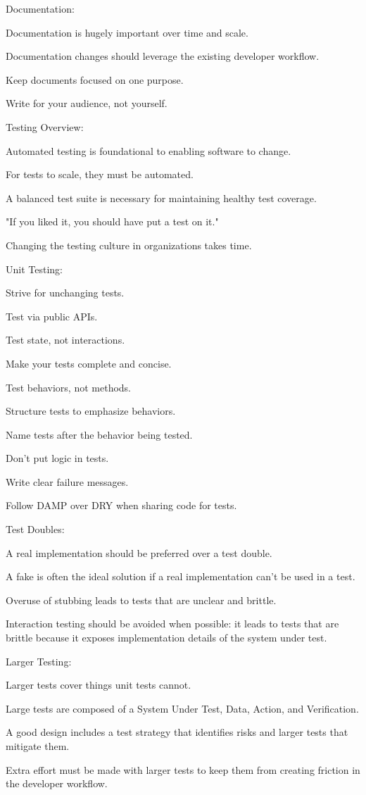 Documentation:
\bit
\item Documentation is hugely important over time and scale.
\item Documentation changes should leverage the existing developer workflow.
\item Keep documents focused on one purpose.
\item Write for your audience, not yourself.
\eit

Testing Overview:
\bit
\item Automated testing is foundational to enabling software to change.
\item For tests to scale, they must be automated.
\item A balanced test suite is necessary for maintaining healthy test coverage.
\item "If you liked it, you should have put a test on it."
\item Changing the testing culture in organizations takes time.
\eit

Unit Testing:
\bit
\item Strive for unchanging tests.
\item Test via public APIs.
\item Test state, not interactions.
\item Make your tests complete and concise.
\item Test behaviors, not methods.
\item Structure tests to emphasize behaviors.
\item Name tests after the behavior being tested.
\item Don't put logic in tests.
\item Write clear failure messages.
\item Follow DAMP over DRY when sharing code for tests.
\eit

Test Doubles:
\bit
\item A real implementation should be preferred over a test double.
\item A fake is often the ideal solution if a real implementation can't be used in a test.
\item Overuse of stubbing leads to tests that are unclear and brittle.
\item Interaction testing should be avoided when possible: it leads to tests that are brittle because it exposes
implementation details of the system under test.
\eit

Larger Testing:
\bit
\item Larger tests cover things unit tests cannot.
\item Large tests are composed of a System Under Test, Data, Action, and Verification.
\item A good design includes a test strategy that identifies risks and larger tests that mitigate them.
\item Extra effort must be made with larger tests to keep them from creating friction in the developer workflow.
\eit

